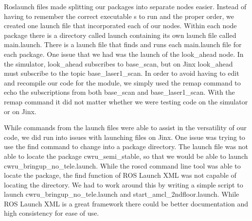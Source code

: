 Roslaunch files made splitting our packages into separate nodes easier. 
Instead of having to remember the correct executable s to run and the proper order, 
we created one launch file that incorporated each of our nodes. 
Within each node package there is a directory called launch containing its own launch file called main.launch. 
There is a launch file that finds and runs each main.launch file for each package. 
One issue that we had was the launch of the look_ahead node. In the simulator, 
look_ahead subscribes to base_scan, but on Jinx look_ahead must subscribe to the topic base_laser1_scan. 
In order to avoid having to edit and recompile our code for the module, we simply used the remap command to echo 
the subscriptions from both base_scan and base_laser1_scan. With the remap command it did not matter 
whether we were testing code on the simulator or on Jinx.

While commands from the launch files were able to assist in the versatility of our code, we did run into issues 
with launching files on Jinx. One issue was trying to use the find command to change into a package directory. The 
launch file was not able to locate the package cwru_semi_stable, so that we would be able to
 launch cwru_bringup_no_tele.launch. While the roscd command line tool was able to locate the package, 
the find function of ROS Launch XML was not capable of locating the directory. We had to work around this by 
writing a simple script to launch cwru_bringup_no_tele.launch and start_amcl_2ndfloor.launch.
While ROS Launch XML is a great framework there could be better documentation and high consistency for ease of use.

